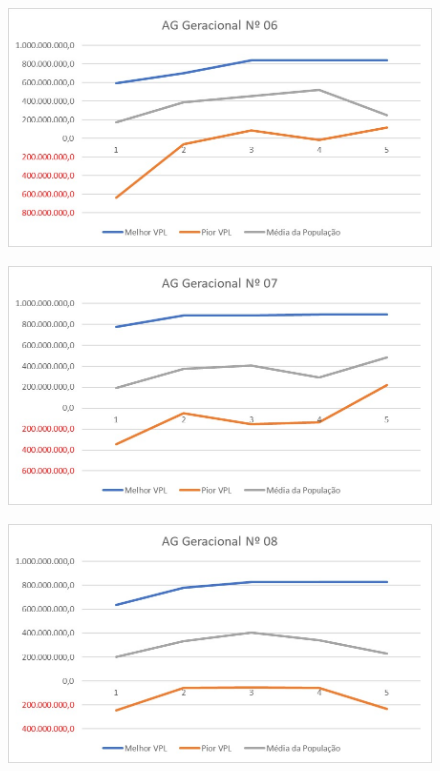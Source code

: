 \documentclass[12pt,a4paper]{report}
\begin{document}
\begin{figure}[H]
\centering

\includegraphics[scale=1]{AGG/6}

\end{figure}

\begin{figure}[H]
\centering

\includegraphics[scale=1]{AGG/7}

\end{figure}

\begin{figure}[H]
\centering

\includegraphics[scale=1]{AGG/8}

\end{figure}
\end{document}
